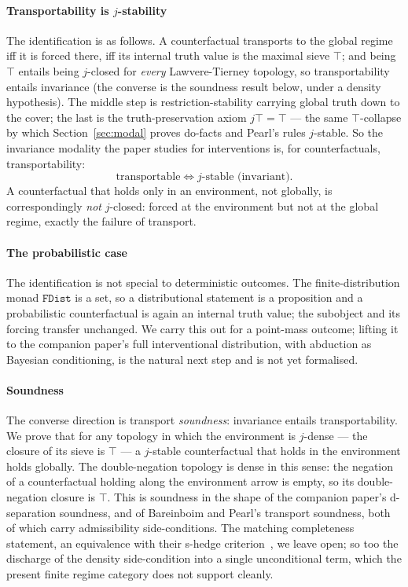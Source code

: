 \documentclass{lmcs}
\begin{document}
\paragraph{Transportability is $j$-stability}
The identification is as follows.
A counterfactual transports to the global regime iff it is forced there, iff its internal truth value is the maximal sieve $\top$; and being $\top$ entails being $j$-closed for \emph{every} Lawvere-Tierney topology, so transportability entails invariance (the converse is the soundness result below, under a density hypothesis).
The middle step is restriction-stability carrying global truth down to the cover; the last is the truth-preservation axiom $j\top = \top$ --- the same $\top$-collapse by which Section~\ref{sec:modal} proves do-facts and Pearl's rules $j$-stable.
So the invariance modality the paper studies for interventions is, for counterfactuals, transportability:
\[ \text{transportable} \iff \text{$j$-stable (invariant)}. \]
A counterfactual that holds only in an environment, not globally, is correspondingly \emph{not} $j$-closed: forced at the environment but not at the global regime, exactly the failure of transport.

\paragraph{The probabilistic case}
The identification is not special to deterministic outcomes.
The finite-distribution monad $\mathtt{FDist}$ is a set, so a distributional statement is a proposition and a probabilistic counterfactual is again an internal truth value; the subobject and its forcing transfer unchanged. We carry this out for a point-mass outcome; lifting it to the companion paper's full interventional distribution, with abduction as Bayesian conditioning, is the natural next step and is not yet formalised.

\paragraph{Soundness}
The converse direction is transport \emph{soundness}: invariance entails transportability.
We prove that for any topology in which the environment is $j$-dense --- the closure of its sieve is $\top$ --- a $j$-stable counterfactual that holds in the environment holds globally.
The double-negation topology is dense in this sense: the negation of a counterfactual holding along the environment arrow is empty, so its double-negation closure is $\top$.
This is soundness in the shape of the companion paper's d-separation soundness, and of Bareinboim and Pearl's transport soundness, both of which carry admissibility side-conditions.
The matching completeness statement, an equivalence with their s-hedge criterion~\cite{bareinboim-pearl-2013}, we leave open; so too the discharge of the density side-condition into a single unconditional term, which the present finite regime category does not support cleanly.
\end{document}
